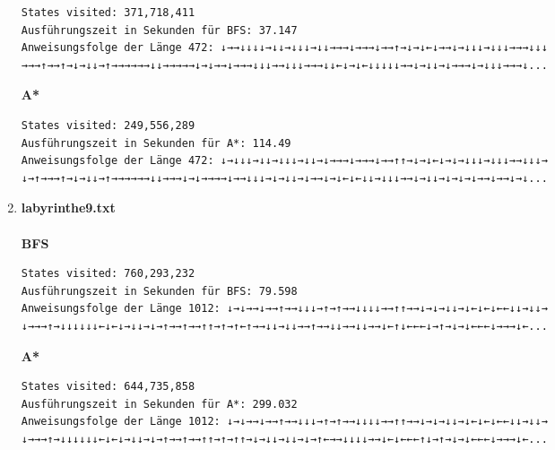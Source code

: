 \documentclass[a4paper,10pt,ngerman]{scrartcl}
\begin{document}
\begin{enumerate}
\begin{verbatim}
States visited: 371,718,411
Ausführungszeit in Sekunden für BFS: 37.147
Anweisungsfolge der Länge 472: ↓→→↓↓↓↓→↓↓→↓↓↓→↓↓→→→↓→→→↓→→↑→↓→↓←↓→→↓→↓↓↓→↓↓↓→→→↓↓↓
→→→↑→→↑→↓→↓↓→↑→→→→→→↓↓→→→→→↓→↓→→↓→→→↓↓↓→→↓↓↓→→→↓↓←↓→↓←↓↓↓↓↓→→↓→↓↓→↓→→→↓→↓↓↓→→→↓...
\end{verbatim}
\textbf{A*}
\begin{verbatim}
States visited: 249,556,289
Ausführungszeit in Sekunden für A*: 114.49
Anweisungsfolge der Länge 472: ↓→↓↓↓→↓↓→↓↓↓→↓↓→↓→→→↓→→→↓→→↑↑→↓→↓←↓→↓→↓↓↓→↓↓↓→→↓↓↓→
↓→↑→→→↑→↓→↓↓→↑→→→→→→↓↓→→→↓→↓→→→→↓→→↓↓↓→↓→↓↓→↓→→↓→↓←↓←↓↓→↓↓↓→→↓→↓↓→↓→↓→↓→→↓→→↓→↓...
\end{verbatim}
  \item \textbf{labyrinthe9.txt}\\
\\\textbf{BFS}
\begin{verbatim}
States visited: 760,293,232
Ausführungszeit in Sekunden für BFS: 79.598
Anweisungsfolge der Länge 1012: ↓→↓→→↓→→↑→→↓↓↓→↑→↑→→↓↓↓↓→→↑↑→→↓→↓→↓↓→↓←↓←↓←←↓↓→↓↓→
↓→→→↑→↓↓↓↓↓↓←↓←↓→↓↓→↓→↑→→↑→→↑↑→↑→↑←↑→→↓↓→↓↓→→↑→→↓↓→→↓↓→→↓←↑↓←←←↓→↑→↓→↓←←←↓→→→↓←...
\end{verbatim}
\textbf{A*}
\begin{verbatim}
States visited: 644,735,858
Ausführungszeit in Sekunden für A*: 299.032
Anweisungsfolge der Länge 1012: ↓→↓→→↓→→↑→→↓↓↓→↑→↑→→↓↓↓↓→→↑↑→→↓→↓→↓↓→↓←↓←↓←←↓↓→↓↓→
↓→→→↑→↓↓↓↓↓↓←↓←↓→↓↓→↓→↑→→↑→→↑↑→↑→↑↑→↓→↓↓→↓↓→↓→↑←→→↓↓↓↓→→↓←↓←←←↑↓→↑→↓→↓←←←↓→→→↓←...
\end{verbatim}
\end{enumerate}
\end{document}

